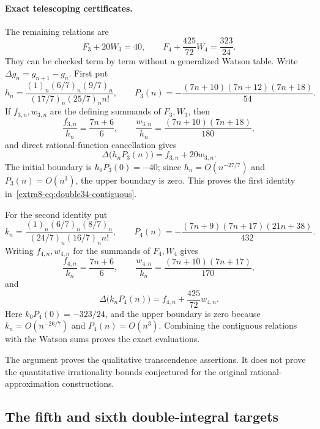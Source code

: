 \documentclass[11pt,a4paper]{article}
\theoremstyle{definition}
\theoremstyle{remark}
\numberwithin{equation}{section}
\begin{document}
\paragraph{Exact telescoping certificates.}
The remaining relations are
\begin{equation}
 F_3+20W_3=40,\qquad
 F_4+\frac{425}{72}W_4=\frac{323}{24}.
 \label{extra8-eq:double34-contiguous}
\end{equation}
They can be checked term by term without a generalized Watson table.
Write $\Delta g_n=g_{n+1}-g_n$.  First put
\[
 h_n=\frac{(1)_n(6/7)_n(9/7)_n}{(17/7)_n(25/7)_n n!},\qquad
 P_3(n)=-\frac{(7n+10)(7n+12)(7n+18)}{54}.
\]
If $f_{3,n},w_{3,n}$ are the defining summands of $F_3,W_3$, then
\[
 \frac{f_{3,n}}{h_n}=\frac{7n+6}{6},\qquad
 \frac{w_{3,n}}{h_n}=\frac{(7n+10)(7n+18)}{180},
\]
and direct rational-function cancellation gives
\[
 \Delta\bigl(h_nP_3(n)\bigr)=f_{3,n}+20w_{3,n}.
\]
The initial boundary is $h_0P_3(0)=-40$; since
$h_n=O(n^{-27/7})$ and $P_3(n)=O(n^3)$, the upper boundary is zero.
This proves the first identity in~\eqref{extra8-eq:double34-contiguous}.

For the second identity put
\[
 k_n=\frac{(1)_n(6/7)_n(8/7)_n}{(24/7)_n(16/7)_n n!},\qquad
 P_4(n)=-\frac{(7n+9)(7n+17)(21n+38)}{432}.
\]
Writing $f_{4,n},w_{4,n}$ for the summands of $F_4,W_4$ gives
\[
 \frac{f_{4,n}}{k_n}=\frac{7n+6}{6},\qquad
 \frac{w_{4,n}}{k_n}=\frac{(7n+10)(7n+17)}{170},
\]
and
\[
 \Delta\bigl(k_nP_4(n)\bigr)=f_{4,n}+\frac{425}{72}w_{4,n}.
\]
Here $k_0P_4(0)=-323/24$, and the upper boundary is zero because
$k_n=O(n^{-26/7})$ and $P_4(n)=O(n^3)$.
Combining the contiguous relations with the Watson sums proves the
exact evaluations.

The argument proves the qualitative transcendence assertions.  It does
not prove the quantitative irrationality bounds conjectured for the
original rational-approximation constructions.

\subsection{The fifth and sixth double-integral targets}
\end{document}
